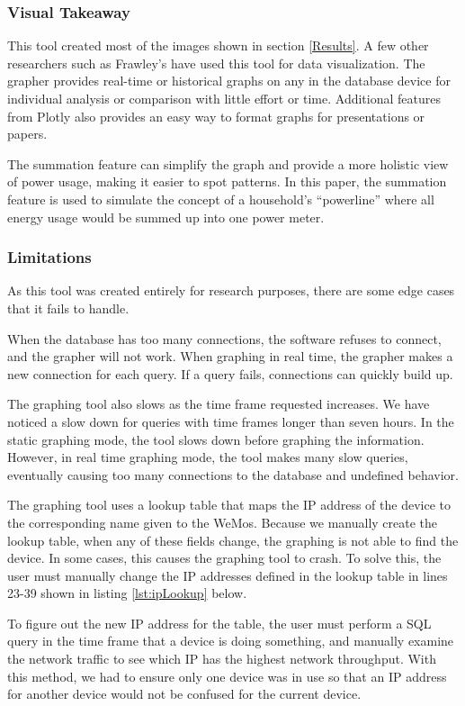 \subsubsection{Visual Takeaway}
This tool created most of the images shown in section \ref{Results}. A few other researchers such as Frawley's have used this tool for data visualization. The grapher provides real-time or historical graphs on any in the database device for individual analysis or comparison with little effort or time. Additional features from Plotly also provides an easy way to format graphs for presentations or papers.

The summation feature can simplify the graph and provide a more holistic view of power usage, making it easier to spot patterns. In this paper, the summation feature is used to simulate the concept of a household's ``powerline'' where all energy usage would be summed up into one power meter.

\subsubsection{Limitations}
As this tool was created entirely for research purposes, there are some edge cases that it fails to handle.

When the database has too many connections, the software refuses to connect, and the grapher will not work. When graphing in real time, the grapher makes a new connection for each query. If a query fails, connections can quickly build up.

The graphing tool also slows as the time frame requested increases. We have noticed a slow down for queries with time frames longer than seven hours. In the static graphing mode, the tool slows down before graphing the information. However, in real time graphing mode, the tool makes many slow queries, eventually causing too many connections to the database and undefined behavior.

The graphing tool uses a lookup table that maps the IP address of the device to the corresponding name given to the WeMos. Because we manually create the lookup table, when any of these fields change, the graphing is not able to find the device. In some cases, this causes the graphing tool to crash. To solve this, the user must manually change the IP addresses defined in the lookup table in lines 23-39 shown in listing \ref{lst:ipLookup} below.

To figure out the new IP address for the table, the user must perform a SQL query in the time frame that a device is doing something, and manually examine the network traffic to see which IP has the highest network throughput. With this method, we had to ensure only one device was in use so that an IP address for another device would not be confused for the current device.

